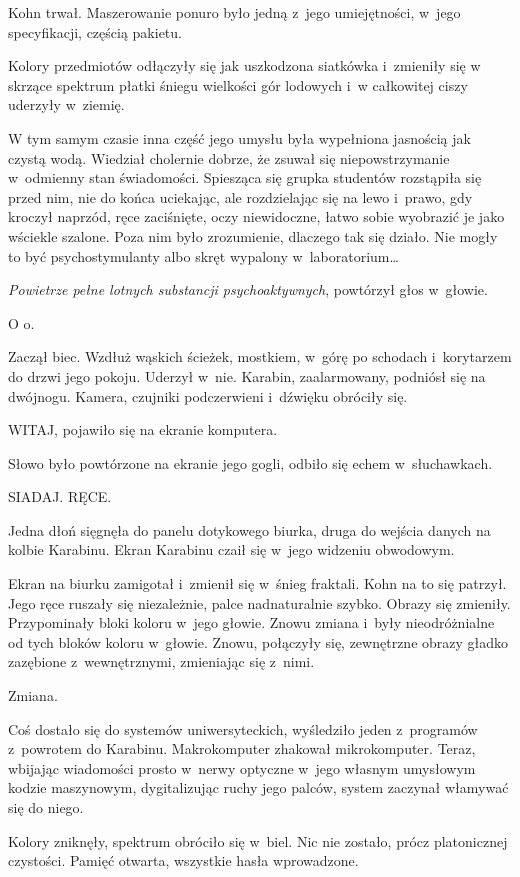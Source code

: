 \documentclass[oneside,polish,11pt,sfheadings]{mwbk}
\begin{document}
Kohn trwał. Maszerowanie ponuro było jedną z~jego umiejętności, w~jego
specyfikacji, częścią pakietu.

Kolory przedmiotów odłączyły się jak uszkodzona siatkówka i~zmieniły się
w skrzące spektrum płatki śniegu wielkości gór lodowych i~w całkowitej
ciszy uderzyły w~ziemię.

W tym samym czasie inna część jego umysłu była wypełniona jasnością jak
czystą wodą. Wiedział cholernie dobrze, że zsuwał się niepowstrzymanie w~odmienny stan świadomości. Spiesząca się grupka studentów rozstąpiła się
przed nim, nie do końca uciekając, ale rozdzielając się na lewo i~prawo,
gdy kroczył naprzód, ręce zaciśnięte, oczy niewidoczne, łatwo sobie
wyobrazić je jako wściekle szalone. Poza nim było zrozumienie, dlaczego
tak się działo. Nie mogły to być psychostymulanty albo skręt wypalony w~laboratorium\ldots

\emph{Powietrze pełne lotnych substancji psychoaktywnych}, powtórzył
głos w~głowie.

O o.

Zaczął biec. Wzdłuż wąskich ścieżek, mostkiem, w~górę po schodach i~korytarzem do drzwi jego pokoju. Uderzył w~nie. Karabin, zaalarmowany,
podniósł się na dwójnogu. Kamera, czujniki podczerwieni i~dźwięku
obróciły się.

WITAJ, pojawiło się na ekranie komputera.

Słowo było powtórzone na ekranie jego gogli, odbiło się echem w~słuchawkach.

SIADAJ. RĘCE.

Jedna dłoń sięgnęła do panelu dotykowego biurka, druga do wejścia danych
na kolbie Karabinu. Ekran Karabinu czaił się w~jego widzeniu obwodowym.

Ekran na biurku zamigotał i~zmienił się w~śnieg fraktali. Kohn na to się
patrzył. Jego ręce ruszały się niezależnie, palce nadnaturalnie szybko.
Obrazy się zmieniły. Przypominały bloki koloru w~jego głowie. Znowu
zmiana i~były nieodróżnialne od tych bloków koloru w~głowie. Znowu,
połączyły się, zewnętrzne obrazy gładko zazębione z~wewnętrznymi,
zmieniając się z~nimi.

Zmiana.

Coś dostało się do systemów uniwersyteckich, wyśledziło jeden z~programów z~powrotem do Karabinu. Makrokomputer zhakował mikrokomputer.
Teraz, wbijając wiadomości prosto w~nerwy optyczne w~jego własnym
umysłowym kodzie maszynowym, dygitalizując ruchy jego palców, system
zaczynał włamywać się do niego.

Kolory zniknęły, spektrum obróciło się w~biel. Nic nie zostało, prócz
platonicznej czystości. Pamięć otwarta, wszystkie hasła wprowadzone.
\end{document}
